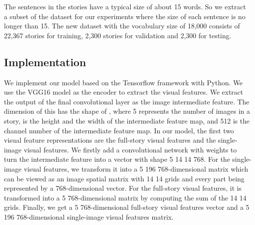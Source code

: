 \documentclass[a4paper,fleqn]{cas-sc}
\begin{document}
The sentences in the stories have a typical size of about 15 words. So we extract a subset of the dataset for our experiments where the size of each sentence is no longer than 15. The new dataset with the vocabulary size of 18,000 consists of 22,367 stories for training, 2,300 stories for validation and 2,300 for testing. 

\subsection{ Implementation} We implement our model based on the Tensorflow framework with Python. We use the VGG16 model as the encoder to extract the visual features. We extract the output of the final convolutional layer as the image intermediate feature. The dimension of this has the shape of , where 5 represents the number of images in a story,  is the height and the width of the intermediate feature map, and 512 is the channel number of the intermediate feature map. In our model, the first two visual feature representations are  the full-story visual features  and  the single-image visual features. We firstly add a convolutional network with  weights  to turn the intermediate feature into a vector with  shape  5  14  14  768. For the single-image visual features, we transform it into a 5  196  768-dimensional matrix which can be viewed as an image spatial matrix with 14  14 grids and every part being represented by a 768-dimensional vector. For the full-story visual features, it is transformed into a 5  768-dimensional matrix by computing the sum of the 14  14 grids. Finally, we get a 5  768-dimensional full-story visual features vector and a 5  196  768-dimensional single-image visual features matrix. 
\end{document}
